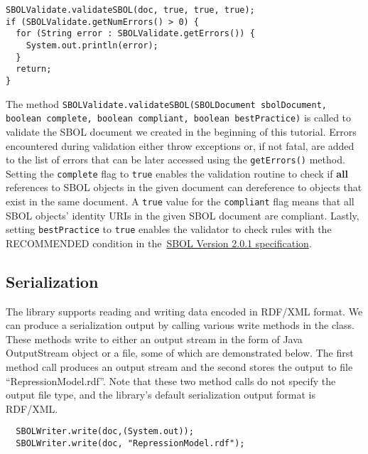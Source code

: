 \vspace{\abovedisplayskip}
\begin{minipage}{0.95\textwidth} 
\begin{lstlisting}
SBOLValidate.validateSBOL(doc, true, true, true);
if (SBOLValidate.getNumErrors() > 0) {
  for (String error : SBOLValidate.getErrors()) {
    System.out.println(error);
  }
  return;
}
\end{lstlisting}
\end{minipage}

The method
\lstinline+SBOLValidate.validateSBOL(SBOLDocument sbolDocument, boolean complete, boolean compliant, boolean bestPractice)+ 
is called to validate the SBOL document we created in the beginning of
this tutorial. Errors encountered during validation either throw
exceptions or, if not fatal, are added to the list of errors that can
be later accessed using the \lstinline+getErrors()+ method. Setting the \lstinline+complete+
flag to \lstinline+true+ enables the validation routine to check if
{\bf all} references to SBOL objects in the given document can
dereference to objects that exist in the same document. A
\lstinline+true+ value for the \lstinline+compliant+ flag means that
all SBOL objects' identity URIs in the given SBOL document are
compliant. Lastly, setting \lstinline+bestPractice+ to
\lstinline+true+ enables the validator to check rules with the
RECOMMENDED condition in the~\href{http://sbolstandard.org/downloads/specification-data-model-2-0/}{SBOL
  Version 2.0.1 specification}.

\subsection*{Serialization}
The library supports reading and writing data encoded in RDF/XML
format. We can produce a serialization output by
calling various write methods in the 
class. These methods write to either an output stream in the form of
Java OutputStream object or a file, some
of which are demonstrated below. The first method call produces an output
stream and the second stores the output to file
``RepressionModel.rdf''. Note that these two method calls do not
specify the output file type, and the library's default serialization
output format is RDF/XML.

\vspace{\abovedisplayskip}
\begin{minipage}{0.95\textwidth} 
\begin{lstlisting}
  SBOLWriter.write(doc,(System.out));
  SBOLWriter.write(doc, "RepressionModel.rdf");
\end{lstlisting}
\end{minipage}

